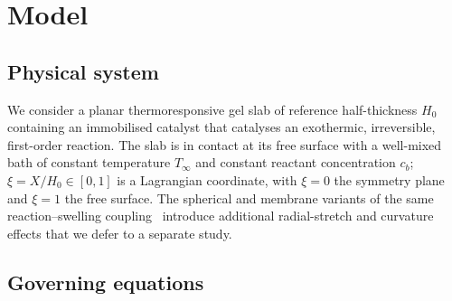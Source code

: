 \section{Model}
\label{sec:model}

\subsection{Physical system}

We consider a planar thermoresponsive gel slab of reference
half-thickness $H_0$ containing an immobilised catalyst that catalyses
an exothermic, irreversible, first-order reaction. The slab is
in contact at its free surface with a well-mixed bath of constant
temperature $T_\infty$ and constant reactant concentration $c_b$;
$\xi=X/H_0\in[0,1]$ is a Lagrangian coordinate, with $\xi=0$ the
symmetry plane and $\xi=1$ the free surface. The spherical and
membrane variants of the same reaction--swelling
coupling~\cite{Siegel1988,Siegel1993,Boissonade2003,BoissonadeDeKepper2011}
introduce additional radial-stretch and curvature effects that we
defer to a separate study.

\subsection{Governing equations}

